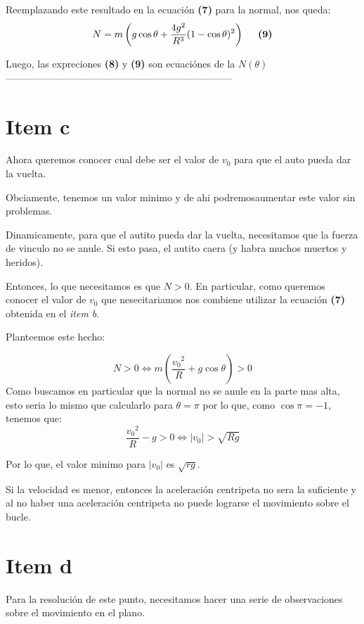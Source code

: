 \documentclass[fleqn,10pt]{SelfArx} %
\newcommand{\sii}{\Longleftrightarrow}
\begin{document}
Reemplazando este resultado en la ecuación \textbf{(7)} para la normal, nos queda:
\[N = m \left( g \cos{\theta} +  \frac{4g^2}{R^3} (1-\cos{\theta})^2 \right) \hspace{0.5cm} \textbf{(9)}\]

Luego, las expreciones \textbf{(8)} y \textbf{(9)} son ecuaciónes de la  $N(\theta)$
---------------------------------------------------------------------

\section*{Item c}

Ahora queremos conocer cual debe ser el valor de $v_0$ para que el auto pueda dar la vuelta. 

Obciamente, tenemos un valor minimo y de ahi podremosaumentar este valor sin problemas. 

Dinamicamente, para que el autito pueda dar la vuelta, necesitamos que la fuerza de vinculo no se anule. Si esto pasa, el autito caera (y habra muchos muertos y heridos). 

Entonces, lo que necesitamos es que $N > 0$. En particular, como queremos conocer el valor de $v_0$ que nesecitariamos nos combiene utilizar la ecuación \textbf{(7)} obtenida en el \textit{item b}. 

Planteemos este hecho:

\[ N >0 \sii  m \left( \frac{{v_0}^2}{R} +  g \cos{\theta} \right) > 0 \]
 Como buscamos en particular que la normal no se anule en la parte mas alta, esto seria lo mismo que calcularlo para $\theta = \pi$ por lo que, como $\cos{\pi} = -1$, tenemos que:
 \[\frac{{v_0}^2}{R} -  g   > 0 \sii |v_0|  > \sqrt{Rg}\]
 
Por lo que, el valor minimo para $|v_0|$ es $\sqrt{rg}$.

Si la velocidad es menor, entonces la aceleración centripeta no sera la suficiente y al no haber una aceleración centripeta no puede lograrse el movimiento sobre el bucle.
\section*{Item d}
\def\iangle{35} %
\def\arcr{0.7cm} %
Para la resolución de este punto, necesitamos hacer una serie de observaciones sobre el movimiento en el plano. 
\end{document}
